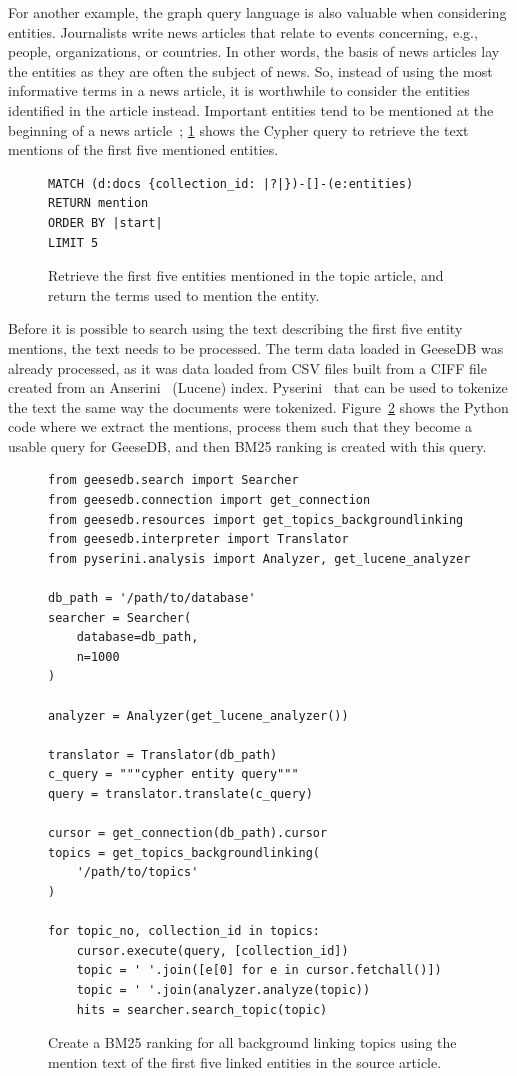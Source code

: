 For another example, the graph query language is also valuable when considering entities. Journalists write news articles that relate to events concerning, e.g., people, organizations, or countries. In other words, the basis of news articles lay the entities as they are often the subject of news. So, instead of using the most informative terms in a news article, it is worthwhile to consider the entities identified in the article instead. Important entities tend to be mentioned at the beginning of a news article~\cite{trec-2019}; \cref{fig:entity-cypher} shows the Cypher query to retrieve the text mentions of the first five mentioned entities.

\begin{figure}
	\begin{verbatim}
MATCH (d:docs {collection_id: |?|})-[]-(e:entities)
RETURN mention
ORDER BY |start|
LIMIT 5
	\end{verbatim}
	\caption{Retrieve the first five entities mentioned in the topic article, and return the terms used to mention the entity.}
	\label{fig:entity-cypher}
\end{figure}
\noindent Before it is possible to search using the text describing the first five entity mentions, the text needs to be processed. The term data loaded in GeeseDB was already processed, as it was data loaded from CSV files built from a CIFF file created from an Anserini~\citep{anserini} (Lucene) index. Pyserini~\citep{pyserini} that can be used to tokenize the text the same way the documents were tokenized. Figure~\ref{fig:entities-code} shows the Python code where we extract the mentions, process them such that they become a usable query for GeeseDB, and then BM25 ranking is created with this query.

\begin{figure}
	\begin{verbatim}
from geesedb.search import Searcher
from geesedb.connection import get_connection
from geesedb.resources import get_topics_backgroundlinking
from geesedb.interpreter import Translator
from pyserini.analysis import Analyzer, get_lucene_analyzer

db_path = '/path/to/database'
searcher = Searcher(
    database=db_path,
    n=1000
)

analyzer = Analyzer(get_lucene_analyzer())

translator = Translator(db_path)
c_query = """cypher entity query"""
query = translator.translate(c_query)

cursor = get_connection(db_path).cursor
topics = get_topics_backgroundlinking(
    '/path/to/topics'
)

for topic_no, collection_id in topics:
    cursor.execute(query, [collection_id])
    topic = ' '.join([e[0] for e in cursor.fetchall()]) 
    topic = ' '.join(analyzer.analyze(topic))
    hits = searcher.search_topic(topic)
	\end{verbatim}
	\caption{Create a BM25 ranking for all background linking topics using the mention text of the first five linked entities in the source article.}
	\label{fig:entities-code}
\end{figure}

